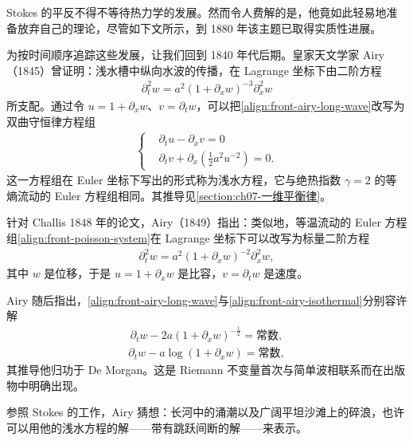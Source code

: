 \documentclass[../../main.tex]{subfiles}
\begin{document}
Stokes 的平反不得不等待热力学的发展。然而令人费解的是，他竟如此轻易地准备放弃自己的理论，尽管如下文所示，到 1880 年该主题已取得实质性进展。

为按时间顺序追踪这些发展，让我们回到 1840 年代后期。皇家天文学家 Airy（1845）曾证明：浅水槽中纵向水波的传播，在 Lagrange 坐标下由二阶方程
\begin{align}
\partial_t^{2}w=a^{2}(1+\partial_x w)^{-3}\partial_x^{2}w\label{align:front-airy-long-wave}
\end{align}
所支配。通过令 $u=1+\partial_x w$、$v=\partial_t w$，可以把\eqref{align:front-airy-long-wave}改写为双曲守恒律方程组
\begin{align}
\left\{\begin{aligned}
&\partial_t u-\partial_x v=0\\
&\partial_t v+\partial_x\left(\frac{1}{2}a^{2}u^{-2}\right)=0.
\end{aligned}\right.\label{align:front-shallow-water}
\end{align}
这一方程组在 Euler 坐标下写出的形式称为浅水方程，它与绝热指数 $\gamma=2$ 的等熵流动的 Euler 方程组相同。其推导见\cref{section:ch07-一维平衡律}。

针对 Challis 1848 年的论文，Airy（1849）指出：类似地，等温流动的 Euler 方程组\eqref{align:front-poisson-system}在 Lagrange 坐标下可以改写为标量二阶方程
\begin{align}
\partial_t^{2}w=a^{2}(1+\partial_x w)^{-2}\partial_x^{2}w,\label{align:front-airy-isothermal}
\end{align}
其中 $w$ 是位移，于是 $u=1+\partial_x w$ 是比容，$v=\partial_t w$ 是速度。

Airy 随后指出，\eqref{align:front-airy-long-wave}与\eqref{align:front-airy-isothermal}分别容许解
\begin{align}
\partial_t w-2a(1+\partial_x w)^{-\frac{1}{2}}=\text{常数},\label{align:front-airy-invariant-1}
\end{align}
\begin{align}
\partial_t w-a\log(1+\partial_x w)=\text{常数},\label{align:front-airy-invariant-2}
\end{align}
其推导他归功于 De Morgan。这是 Riemann 不变量首次与简单波相联系而在出版物中明确出现。

参照 Stokes 的工作，Airy 猜想：长河中的涌潮以及广阔平坦沙滩上的碎浪，也许可以用他的浅水方程的解——带有跳跃间断的解——来表示。
\end{document}
